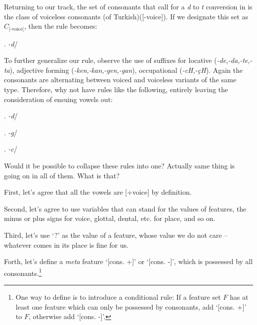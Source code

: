 \documentclass[11pt]{article}
\newcommand{\morphrule}[3]{{\it#1}\hspace{10pt}\sysm{\imp}\hspace{10pt}{\it#2}\hspace{10pt}/\hspace{10pt}{\it#3}}
\begin{document}
{\item Returning to our track, the set of consonants that call for a \emph{d} to
\emph{t} conversion in
  is the class of voiceless consonants (of Turkish)([-voice]). If we
designate this set as $C_{\text{[-voice]}}$, then the rule becomes:


\ex.\label{voice} \morphrule{-d}{-t}{$C_{\text{[-voice]}}$\cntx$H$}


% 
% 

\item To further generalize our rule, observe the use of suffixes for locative (\emph{-de,-da,-te,-ta}),
adjective forming (\emph{-ken,-kan,-gen,-gan}), occupational (\emph{-cH,-\c{c}H}).
Again the consonants are alternating between voiced and voiceless variants of the
same type. Therefore, why not have rules like the following, entirely leaving the
consideration of ensuing vowels out:

\ex. \morphrule{-d}{-t}{$C_{\text{[-voice]}}$\cntx}

\ex. \morphrule{-g}{-k}{$C_{\text{[-voice]}}$\cntx}

\ex. \morphrule{-c}{-\c c}{$C_{\text{[-voice]}}$\cntx}

\item Would it be possible to collapse these rules into one? Actually same thing
is going on in all of them. What is that?

\item First, let's agree that all the vowels are [+voice] by definition. 

\item[] Second, let's agree to use  variables that can stand for the values of
features, the minus or plus signs for voice, glottal, dental, etc. for place,
and so on. 

\item[] Third, let's use `?' as the value of a feature, whose value we do not
care -- whatever comes in its place is fine for us. 

\item[] Forth, let's define a \emph{meta} feature `[cons. +]' or `[cons. -]',
which is possessed by all consonants.\footnote{One way to define is to introduce
a conditional rule: If a feature set $F$ has at least one feature which can only be
possessed by consonants, add `[cons. +]' to $F$, otherwise add `[cons. -]'.} 

}
\end{document}
